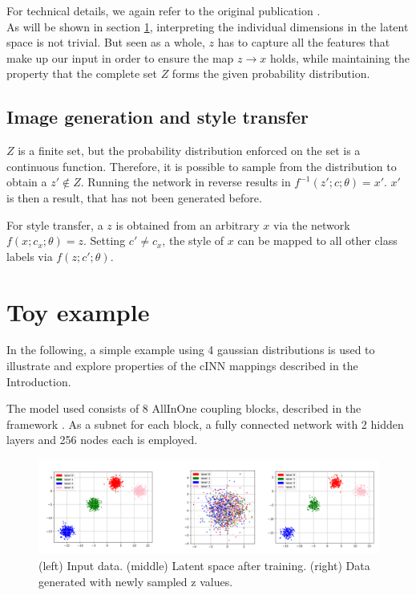 \documentclass[final]{cvpr}
\begin{document}
For technical details, we again refer to the original publication \cite{main_paper_CINN}. \\

As will be shown in section \ref{toy}, interpreting the individual dimensions in the latent space is not trivial. But seen as a whole, $z$ has to capture all the features that make up our input in order to ensure the map $z \rightarrow x $ holds, while maintaining the property that the complete set $Z$ forms the given probability distribution. 

\subsection{Image generation and style transfer}
$Z$ is a finite set, but the probability distribution enforced on the set is a continuous function. Therefore, it is possible to sample from the distribution to obtain a $z' \notin Z$. Running the network in reverse results in $f^{-1}(z';c;\theta) = x'$. $x'$ is then a result, that has not been generated before. 

For style transfer, a $z$ is obtained from an arbitrary $x$ via the network $f(x;c_x;\theta) = z$. Setting $c' \neq c_x$, the style of $x$ can be mapped to all other class labels via $f(z;c';\theta)$.

\section{Toy example}\label{toy}
In the following, a simple example using 4 gaussian distributions is used to illustrate and explore properties of the cINN mappings described in the Introduction.

The model used consists of 8 AllInOne coupling blocks, described in the framework \cite{freia}. As a subnet for each block, a fully connected network with 2 hidden layers and 256 nodes each is employed.

\begin{figure}[t]
	\begin{center}
		\includegraphics[width=1.0\linewidth]{./figs/toy/no_style/combined.png}
	\end{center}
	\caption{(left) Input data. (middle) Latent space after training. (right) Data generated with newly sampled z values.}
	\label{fig:toy_generation}
\end{figure}
\end{document}
